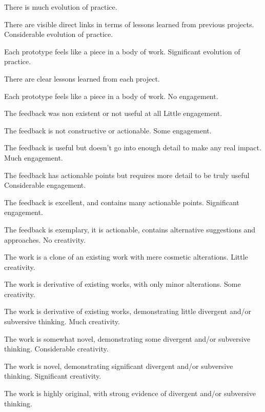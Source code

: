 \documentclass{../../fal_assignment}
\begin{document}
\begin{markingrubric}
	\grade There is much evolution of practice.
	\par There are visible direct links in terms of lessons learned from previous projects.
	\grade Considerable evolution of practice.
	\par Each prototype feels like a piece in a body of work.
	\grade Significant evolution of practice.
	\par There are clear lessons learned from each project.
	\par Each prototype feels like a piece in a body of work.
	\grade\fail No engagement.
	\par The feedback was non existent or not useful at all
	\grade Little engagement.
	\par The feedback is not constructive or actionable.
	\grade Some engagement.
	\par The feedback is useful but doesn't go into enough detail to make any real impact.
	\grade Much engagement.
	\par The feedback has actionable points but requires more detail to be truly useful
	\grade Considerable engagement.
	\par The feedback is excellent, and contains many actionable points.
	\grade Significant engagement.
	\par The feedback is exemplary, it is actionable, contains alternative suggestions and approaches.
	\grade\fail No creativity.
	\par The work is a clone of an existing work with mere cosmetic alterations.
	\grade Little creativity.
	\par The work is derivative of existing works, with only minor alterations.
	\grade Some creativity.
	\par The work is derivative of existing works, demonstrating little divergent and/or subversive thinking.
	\grade Much creativity.
	\par The work is somewhat novel, demonstrating some divergent and/or subversive thinking.
	\grade Considerable creativity.
	\par The work is novel, demonstrating significant divergent and/or subversive thinking.
	\grade Significant creativity.
	\par The work is highly original, with strong evidence of divergent and/or subversive thinking.
	
\end{markingrubric}
\end{document}

